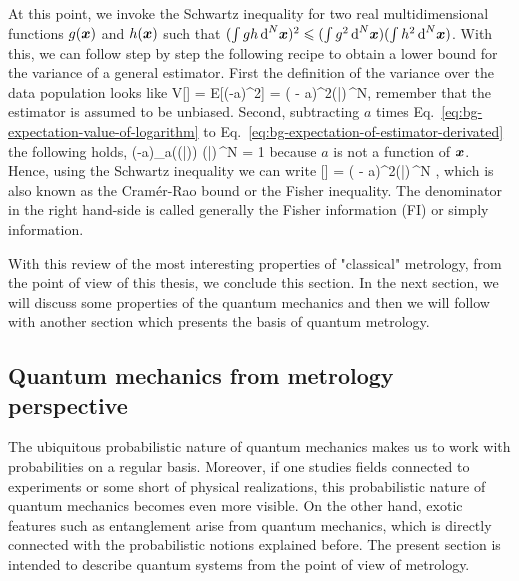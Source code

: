 At this point, we invoke the Schwartz inequality for two real multidimensional functions $g(\boldsymbol{x})$ and $h(\boldsymbol{x})$ such that $(\int g h \,\text{d}^N\boldsymbol{x})^2\leqslant (\int g^2 \,\text{d}^N\boldsymbol{x}) (\int h^2 \,\text{d}^N\boldsymbol{x})$.
With this, we can follow step by step the following recipe to obtain a lower bound for the variance of a general estimator.
First the definition of the variance over the data population looks like
\be
  V[] = E[(-a)^2] = \int ( - a)^2\prob(|)\,^N,
\ee
remember that the estimator is assumed to be unbiased.
Second, subtracting $a$ times Eq.~\eqref{eq:bg-expectation-value-of-logarithm} to Eq.~\eqref{eq:bg-expectation-of-estimator-derivated} the following holds,
\be
  \int (-a)\partial_a\big(\ln  \prob(|)\big) \prob(|)\,^N = 1
\ee
because $a$ is not a function of $\boldsymbol{x}$.
Hence, using the Schwartz inequality we can write
\be
  \label{eq:bg-classical-cr-bound-and-fi}
  [] = \int ( - a)^2\prob(|)\,^N \geqslant {},
\ee
which is also known as the Cram\'er-Rao bound or the Fisher inequality.
The denominator in the right hand-side is called generally the Fisher information (FI) or simply information.

With this review of the most interesting properties of "classical" metrology, from the point of view of this thesis, we conclude this section.
In the next section, we will discuss some properties of the quantum mechanics and then we will follow with another section which presents the basis of quantum metrology.

\subsection{Quantum mechanics from metrology perspective}
\label{sec:bg-quantum-mechanics-for-metrology}

The ubiquitous probabilistic nature of quantum mechanics makes us to work with probabilities on a regular basis.
Moreover, if one studies fields connected to experiments or some short of physical realizations, this probabilistic nature of quantum mechanics becomes even more visible.
On the other hand, exotic features such as entanglement arise from quantum mechanics, which is directly connected with the probabilistic notions explained before.
The present section is intended to describe quantum systems from the point of view of metrology.

